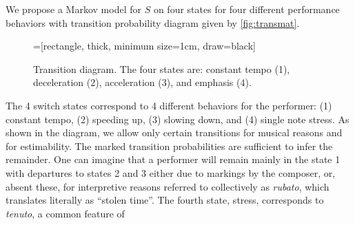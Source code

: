 \documentclass[aoas]{imsart}
\begin{document}
We propose a Markov model for $S$ on four
states for four different performance behaviors
with transition probability
diagram given by \autoref{fig:transmat}.
\begin{figure}[tb!]
  \centering
  =[rectangle,
  thick, minimum size=1cm, draw=black]
  \caption{Transition diagram. The four states are: constant tempo
    (1), deceleration (2), acceleration (3), and emphasis (4).\label{fig:transmat}}
\end{figure}
The 4 switch states correspond to 4 different behaviors for the
performer: (1) constant tempo, (2) speeding up, (3) slowing down, and
(4) single note stress. As shown in the diagram, we allow only certain
transitions for musical reasons and for estimability. The marked
transition probabilities are sufficient to infer the remainder. One
can imagine that a performer will remain mainly in the state 1 with
departures to states 2 and 3 either due to markings by the composer,
or, absent these, for interpretive reasons referred to collectively as
{\em rubato}, which
translates literally as ``stolen time''. The fourth
state, stress, corresponds to {\em tenuto}, a common feature of
\end{document}
